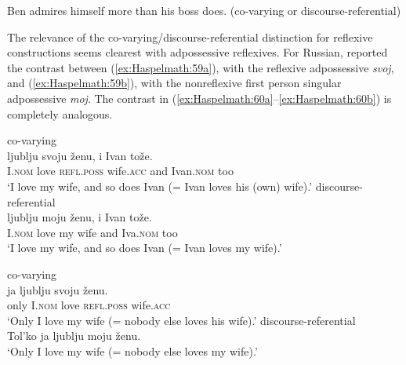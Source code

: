 \documentclass[output=paper]{langscibook}
\begin{document}
\ea%
    \label{ex:Haspelmath:58}
    {Ben} {admires} {himself} {more} {than} {his} {boss} {does.} (co-varying or discourse-referential)
    \z

         

The relevance of the co-varying/discourse-referential distinction for reflexive constructions seems clearest with adpossessive reflexives. For Russian, \citet[106]{Dahl1973} reported the contrast between (\ref{ex:Haspelmath:59a}), with the reflexive adpossessive \textit{svoj}, and (\ref{ex:Haspelmath:59b}), with the nonreflexive first person singular adpossessive \textit{moj}. The contrast in (\ref{ex:Haspelmath:60a}--\ref{ex:Haspelmath:60b}) is completely analogous.

\ea%
    \label{ex:Haspelmath:59}
    \ea co-varying\label{ex:Haspelmath:59a}\\
      {ljublju}  {svoju}  {ženu,}  {i}  {Ivan}  {tože.}\\
       I.\textsc{nom}  love  \textsc{refl.poss}  wife.\textsc{acc}  and  Ivan.\textsc{nom}  too \\
    \glt‘I love my wife, and so does Ivan (= Ivan loves his (own) wife).’
    \ex discourse-referential\label{ex:Haspelmath:59b}\\
      {ljublju}  {moju}  {ženu,}  {i}  {Ivan}    {tože.}  \\
    I.\textsc{nom}  love  my  wife  and  Iva.\textsc{nom}  too\\
    \glt  ‘I love my wife, and so does Ivan (= Ivan loves my wife).’
    \z
\z     

      

\ea%
    \label{ex:Haspelmath:60}
    \ea co-varying\label{ex:Haspelmath:60a}\\
      {ja}  {ljublju}  {svoju}  {ženu.}\\
     only  I.\textsc{nom}  love  \textsc{refl.poss}  wife.\textsc{acc}   \\
    \glt‘Only I love my wife (= nobody else loves his wife).’
    \ex 
     discourse-referential\label{ex:Haspelmath:60b}\\
      {Tol’ko} {ja} {ljublju} {moju} {ženu.}\\
      ‘Only I love my wife (= nobody else loves my wife).’
    \z
\z 
\end{document}
